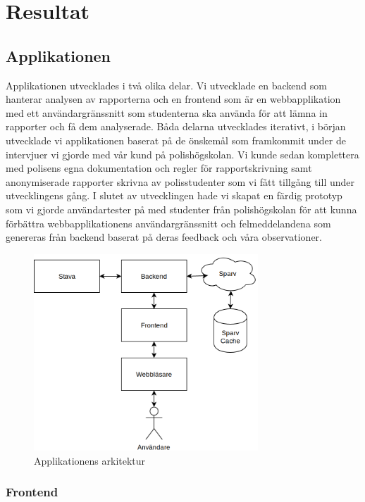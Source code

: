 \documentclass[swedish]{maucsthesis}
\begin{document}
\section{Resultat}
\subsection{Applikationen}\label{applikationen}

Applikationen utvecklades i två olika delar. Vi utvecklade en backend som
hanterar analysen av rapporterna och en frontend som är en webbapplikation med
ett användargränssnitt som studenterna ska använda för att lämna in rapporter
och få dem analyserade. Båda delarna utvecklades iterativt, i början utvecklade
vi applikationen baserat på de önskemål som framkommit under de intervjuer vi
gjorde med vår kund på polishögskolan. Vi kunde sedan komplettera med polisens
egna dokumentation och regler för rapportskrivning samt anonymiserade rapporter
skrivna av polisstudenter som vi fått tillgång till under utvecklingens gång. I
slutet av utvecklingen hade vi skapat en färdig prototyp som vi gjorde
användartester på med studenter från polishögskolan för att kunna förbättra
webbapplikationens användargränssnitt och felmeddelandena som genereras från
backend baserat på deras feedback och våra observationer.

\begin{figure}[H]
    \centering
    \includegraphics[width=0.75\textwidth]{architecture.png}
    \caption{Applikationens arkitektur}
    \label{fig:architecture}
\end{figure}

\subsubsection{Frontend}
\end{document}
